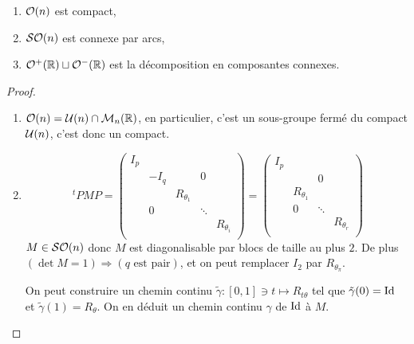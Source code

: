 \begin{prop}
 \begin{enumerate}
  \item $\mathcal{O}(n)$ est compact,
  \item $\mathcal{SO}(n)$ est connexe par arcs,
  \item $\mathcal{O}^+(\mathbb{R}) \sqcup \mathcal{O}^-(\mathbb{R})$ est la décomposition en composantes connexes.
 \end{enumerate}
\end{prop}

\begin{proof}\

\begin{enumerate}
 \item $\mathcal{O}(n) = \mathcal{U}(n) \cap \mathcal{M}_n(\mathbb{R})$, en particulier, c'est un sous-groupe
fermé du compact $\mathcal{U}(n)$, c'est donc un compact.
 \item \begin{displaymath} \ ^tPMP = \begin{pmatrix}
                     I_p &      &             &        & \\
                         & -I_q &             &     0   & \\
                         &      & R_{\theta_1}&        & \\
                         &    0 &             & \ddots & \\
                         &      &             &        & R_{\theta_i} \\
                    \end{pmatrix} = \begin{pmatrix}
                     I_p &             &        & \\
                         &             &     0   & \\
                         & R_{\theta_1}&        & \\
                         &         0    & \ddots & \\
                         &             &        & R_{\theta_r} \\
                    \end{pmatrix} \end{displaymath}
 $M \in \mathcal{SO}(n)$ donc $M$ est diagonalisable par blocs de taille au plus $2$.
De plus $(\det M = 1) \Rightarrow (q\text{ est pair})$, et on peut remplacer
$I_2$ par $R_{\theta_\pi}$.

On peut construire un chemin continu $\tilde{\gamma} : [0,1] \owns t
\longmapsto R_{t\theta}$ tel que $\tilde{\gamma}(0) = \operatorname{Id}$ et
$\tilde{\gamma}(1) = R_\theta$. On en déduit un chemin continu $\gamma$ de $\operatorname{Id}$
à $M$.

\end{enumerate}
\end{proof}


